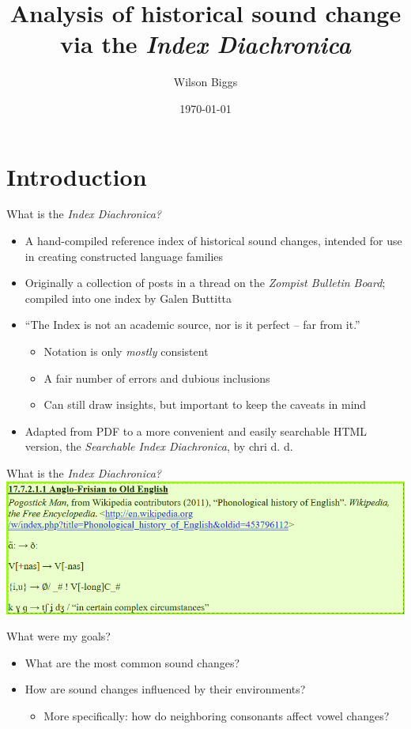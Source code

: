 \documentclass[10pt]{beamer}
\title{Analysis of historical sound change via the \textit{Index Diachronica}}
\date{\today}
\author{Wilson Biggs}
\begin{document}
  \maketitle
  \section*{Introduction}
  \begin{frame}{What is the \textit{Index Diachronica?}}
    \begin{itemize}
      \item A hand-compiled reference index of historical sound changes, intended for use in creating constructed language families
      \item Originally a collection of posts in a thread on the \textit{Zompist Bulletin Board}; compiled into one index by Galen Buttitta
      \item ``The Index is not an academic source, nor is it perfect -- far from it.''
      \begin{itemize}
        \item Notation is only \textit{mostly} consistent
        \item A fair number of errors and dubious inclusions
        \item Can still draw insights, but important to keep the caveats in mind
      \end{itemize}
      \item Adapted from PDF to a more convenient and easily searchable HTML version, the \textit{Searchable Index Diachronica}, by chri d. d.
    \end{itemize}
  \end{frame}
  \begin{frame}{What is the \textit{Index Diachronica?}}
    \includegraphics[width=\textwidth]{sidex.png}
  \end{frame}
  \begin{frame}{What were my goals?}
    \begin{itemize}
      \item What are the most common sound changes?
      \item How are sound changes influenced by their environments?
      \begin{itemize}
        \item More specifically: how do neighboring consonants affect vowel changes?
      \end{itemize}
    \end{itemize}
  \end{frame}
\end{document}
